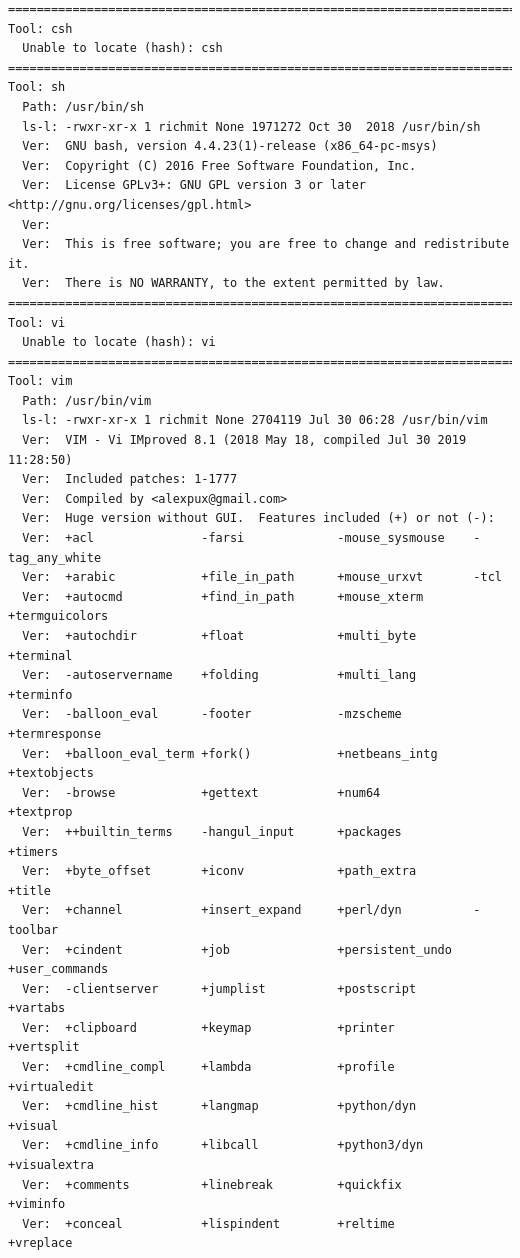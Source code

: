 \documentclass[11pt]{article}
\begin{document}
\begin{verbatim}
==========================================================================================
Tool: csh
  Unable to locate (hash): csh
==========================================================================================
Tool: sh
  Path: /usr/bin/sh
  ls-l: -rwxr-xr-x 1 richmit None 1971272 Oct 30  2018 /usr/bin/sh
  Ver:  GNU bash, version 4.4.23(1)-release (x86_64-pc-msys)
  Ver:  Copyright (C) 2016 Free Software Foundation, Inc.
  Ver:  License GPLv3+: GNU GPL version 3 or later <http://gnu.org/licenses/gpl.html>
  Ver:  
  Ver:  This is free software; you are free to change and redistribute it.
  Ver:  There is NO WARRANTY, to the extent permitted by law.
==========================================================================================
Tool: vi
  Unable to locate (hash): vi
==========================================================================================
Tool: vim
  Path: /usr/bin/vim
  ls-l: -rwxr-xr-x 1 richmit None 2704119 Jul 30 06:28 /usr/bin/vim
  Ver:  VIM - Vi IMproved 8.1 (2018 May 18, compiled Jul 30 2019 11:28:50)
  Ver:  Included patches: 1-1777
  Ver:  Compiled by <alexpux@gmail.com>
  Ver:  Huge version without GUI.  Features included (+) or not (-):
  Ver:  +acl               -farsi             -mouse_sysmouse    -tag_any_white
  Ver:  +arabic            +file_in_path      +mouse_urxvt       -tcl
  Ver:  +autocmd           +find_in_path      +mouse_xterm       +termguicolors
  Ver:  +autochdir         +float             +multi_byte        +terminal
  Ver:  -autoservername    +folding           +multi_lang        +terminfo
  Ver:  -balloon_eval      -footer            -mzscheme          +termresponse
  Ver:  +balloon_eval_term +fork()            +netbeans_intg     +textobjects
  Ver:  -browse            +gettext           +num64             +textprop
  Ver:  ++builtin_terms    -hangul_input      +packages          +timers
  Ver:  +byte_offset       +iconv             +path_extra        +title
  Ver:  +channel           +insert_expand     +perl/dyn          -toolbar
  Ver:  +cindent           +job               +persistent_undo   +user_commands
  Ver:  -clientserver      +jumplist          +postscript        +vartabs
  Ver:  +clipboard         +keymap            +printer           +vertsplit
  Ver:  +cmdline_compl     +lambda            +profile           +virtualedit
  Ver:  +cmdline_hist      +langmap           +python/dyn        +visual
  Ver:  +cmdline_info      +libcall           +python3/dyn       +visualextra
  Ver:  +comments          +linebreak         +quickfix          +viminfo
  Ver:  +conceal           +lispindent        +reltime           +vreplace

\end{verbatim}
\end{document}

